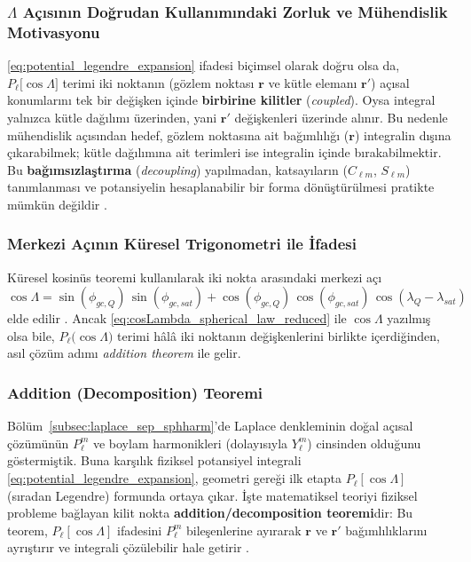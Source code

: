 \subsubsection{$\Lambda$ Açısının Doğrudan Kullanımındaki Zorluk ve Mühendislik Motivasyonu}

\eqref{eq:potential_legendre_expansion} ifadesi biçimsel olarak doğru olsa da, $P_\ell\!\bigl[\cos\Lambda\bigr]$ terimi iki noktanın (gözlem noktası $\mathbf{r}$ ve kütle elemanı $\mathbf{r'}$) açısal konumlarını tek bir değişken içinde \textbf{birbirine kilitler} (\emph{coupled}).
Oysa integral yalnızca kütle dağılımı üzerinden, yani $\mathbf{r'}$ değişkenleri üzerinde alınır.
Bu nedenle mühendislik açısından hedef, gözlem noktasına ait bağımlılığı ($\mathbf{r}$) integralin dışına
çıkarabilmek; kütle dağılımına ait terimleri ise integralin içinde bırakabilmektir.
Bu \textbf{bağımsızlaştırma} (\emph{decoupling}) yapılmadan, katsayıların ($C_{\ell m}$, $S_{\ell m}$)
tanımlanması ve potansiyelin hesaplanabilir bir forma dönüştürülmesi pratikte mümkün değildir \cite{vallado}.

\subsubsection{Merkezi Açının Küresel Trigonometri ile İfadesi}

Küresel kosinüs teoremi kullanılarak iki nokta arasındaki merkezi açı
\begin{equation}
\cos\Lambda
=
\sin(\phi_{gc,Q})\,\sin(\phi_{gc,sat})
+
\cos(\phi_{gc,Q})\,\cos(\phi_{gc,sat})\,\cos(\lambda_Q-\lambda_{sat})
\label{eq:cosLambda_spherical_law_reduced}
\end{equation}
elde edilir \cite{vallado}. Ancak \eqref{eq:cosLambda_spherical_law_reduced} ile
$\cos\Lambda$ yazılmış olsa bile, $P_\ell\!\bigl(\cos\Lambda\bigr)$ terimi hâlâ
iki noktanın değişkenlerini birlikte içerdiğinden, asıl çözüm adımı \emph{addition theorem} ile gelir.

\subsubsection{Addition (Decomposition) Teoremi}

Bölüm~\ref{subsec:laplace_sep_sphharm}’de Laplace denkleminin doğal açısal çözümünün
$P_\ell^m$ ve boylam harmonikleri (dolayısıyla $Y_{\ell}^m$) cinsinden olduğunu göstermiştik.
Buna karşılık fiziksel potansiyel integrali \eqref{eq:potential_legendre_expansion}, geometri gereği
ilk etapta $P_\ell[\cos\Lambda]$ (sıradan Legendre) formunda ortaya çıkar.
İşte matematiksel teoriyi fiziksel probleme bağlayan kilit nokta \textbf{addition/decomposition teoremi}dir:
Bu teorem, $P_\ell[\cos\Lambda]$ ifadesini $P_\ell^m$ bileşenlerine ayırarak
$\mathbf{r}$ ve $\mathbf{r'}$ bağımlılıklarını ayrıştırır ve integrali çözülebilir hale getirir \cite{vallado}.


